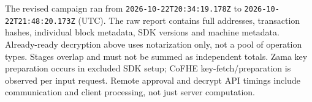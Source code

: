 The revised campaign ran from \texttt{2026-10-22T20:34:19.178Z} to \texttt{2026-10-22T21:48:20.173Z} (UTC).
The raw report contains full addresses, transaction hashes, individual block metadata, SDK versions and machine metadata.
Already-ready decryption above uses notarization only, not a pool of operation types. Stages overlap and must not be summed as independent totals.
Zama key preparation occurs in excluded SDK setup; CoFHE key-fetch/preparation is observed per input request. Remote approval and decrypt API timings include communication and client processing, not just server computation.
